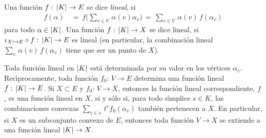 Una funci\'{o}n $f:\,\geom{K}\rightarrow E$ se dice \emph{lineal}, si
\begin{align*}
	f(\alpha) & \,=\,f\Big(\sum_{v\in V}\,\alpha(v)\alpha_{v}\Big) \,=\,
		\sum_{v\in V}\,\alpha(v)\,f(\alpha_{v})
\end{align*}
%
para todo $\alpha\in\geom{K}$. Una funci\'{o}n $f:\,\geom{K}\rightarrow X$ se
dice lineal, si $\inc[X\hookrightarrow E]\circ f:\,\geom{K}\rightarrow E$ es
lineal (en particular, la combinaci\'{o}n lineal
$\sum_{v}\,\alpha(v)\,f(\alpha_{v})$ tiene que ser un punto de $X$).

Toda funci\'{o}n lineal en $\geom{K}$ est\'{a} determinada por su valor en
los v\'{e}rtices $\alpha_{v}$. Rec\'{\i}procamente, toda funci\'{o}n
$f_{0}:\,V\rightarrow E$ determina una funci\'{o}n lineal
$f:\,\geom{K}\rightarrow E$. Si $X\subset E$ y $f_{0}:\,V\rightarrow X$,
entonces la funci\'{o}n lineal correspondiente, $f$, es una funci\'{o}n
lineal en $X$, si y s\'{o}lo si, para todo s\'{\i}mplice $s\in K$, las
combinaciones convexas $\sum_{v\in s}\,t^{v}f_{0}(\alpha_{v})$ tambi\'{e}n
pertenecen a $X$. En particular, si $X$ es un subconjunto convexo de $E$,
entonces toda funci\'{o}n $V\rightarrow X$ se extiende a una funci\'{o}n
lineal $\geom{K}\rightarrow X$.

